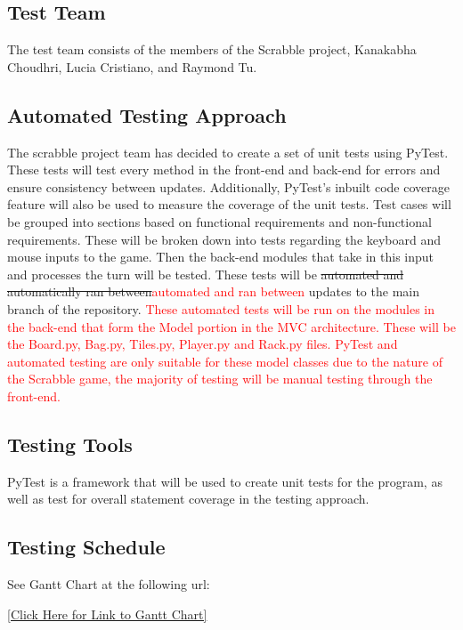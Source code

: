 \documentclass[12pt, titlepage]{article}
\begin{document}
\subsection{Test Team}
The test team consists of the members of the Scrabble project, Kanakabha Choudhri, Lucia Cristiano, and Raymond Tu.

\subsection{Automated Testing Approach}
The scrabble project team has decided to create a set of unit tests using PyTest. These tests will test every method in the front-end and back-end for errors and ensure consistency between updates. Additionally, PyTest's inbuilt code coverage feature will also be used to measure the coverage of the unit tests. Test cases will be grouped into sections based on functional requirements and non-functional requirements. These will be broken down into tests regarding the keyboard and mouse inputs to the game. Then the back-end modules that take in this input and processes the turn will be tested. These tests will be \sout{automated and automatically ran between}\textcolor{red}{automated and ran between } updates to the main branch of the repository. \textcolor{red}{These automated tests will be run on the modules in the back-end that form the Model portion in the MVC architecture. These will be the Board.py, Bag.py, Tiles.py, Player.py and Rack.py files. PyTest and automated testing are only suitable for these model classes due to the nature of the Scrabble game, the majority of testing will be manual testing through the front-end.}

\subsection{Testing Tools} %

PyTest is a framework that will be used to create unit tests for the program, as well as test for overall statement coverage in the testing approach.

\subsection{Testing Schedule} %
		
See Gantt Chart at the following url:

\href{https://gitlab.cas.mcmaster.ca/choudhrk/thetrifecta_scrabble/blob/master/ProjectSchedule/3XA3\%20Gantt\%20Chart.pdf}{[Click Here for Link to Gantt Chart]}
\end{document}
